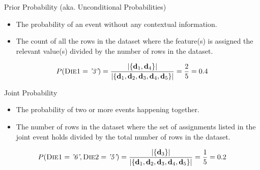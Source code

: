 \documentclass[xcolor={table}]{beamer}
\newcommand{\featN}[1]{\textsc{#1}}
\newcommand{\featL}[1]{\textit{'#1'}}
\begin{document}
 \begin{frame} 
 \begin{alertblock}{Prior Probability (aka. Unconditional Probabilities)}
 \begin{itemize}
 	\item The probability of an event without any contextual information.
	\item The count of all the rows in the dataset where the feature(s) is assigned the relevant value(s) divided by the number of rows in the dataset.
\end{itemize}
\end{alertblock}
\begin{example}
\begin{equation*}
P(\featN{Die1}=\featL{3}) = \frac{|\{ \mathbf{d}_1, \mathbf{d}_4 \}|}{|\{ \mathbf{d}_1, \mathbf{d}_2,\mathbf{d}_3, \mathbf{d}_4, \mathbf{d}_5 \}|}= \frac{2}{5}=0.4
\end{equation*}
\end{example}
\end{frame}

\begin{frame}
\begin{alertblock}{Joint Probability}
\begin{itemize}
	\item The probability of two or more events happening together.
	\item The number of rows in the dataset where the set of assignments listed in the joint event holds divided by the total number of rows in the dataset.
\end{itemize}
\end{alertblock}
\begin{example}
\begin{equation*}
P(\featN{Die1}=\featL{6}, \featN{Die2}=\featL{5})=\frac{|\{ \mathbf{d}_3 \}|}{|\{ \mathbf{d}_1, \mathbf{d}_2,\mathbf{d}_3, \mathbf{d}_4, \mathbf{d}_5 \}|} = \frac{1}{5} = 0.2
\end{equation*}
\end{example}
\end{frame}
\end{document}
